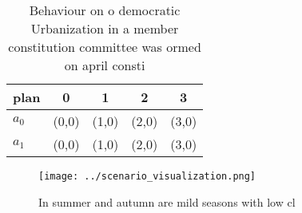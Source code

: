 \documentclass[a4paper]{article}
\begin{document}
\begin{table}
\begin{adjustbox}{width=0.5\columnwidth}
\begin{tabular}{|l|l|l|l|l|}
\hline
\textbf{plan} & \multicolumn{1}{c|}{\textbf{0}} & \multicolumn{1}{c|}{\textbf{1}} & \multicolumn{1}{c|}{\textbf{2}} & \multicolumn{1}{c|}{\textbf{3}} \\ \hline
\textbf{$a_0$}  & (0,0) & (1,0) & (2,0) & (3,0) \\ \hline
\textbf{$a_1$}  & (0,0) & (1,0) & (2,0) & (3,0) \\ \hline
\end{tabular}
\end{adjustbox}
\caption{Behaviour on o democratic Urbanization in a member constitution committee was ormed on april consti
}
\end{table}

\begin{figure}
\centering
\texttt{[image: ../scenario\_visualization.png]}
\caption{In summer and autumn are mild seasons with low cl
}
\end{figure}
 
\end{document}
